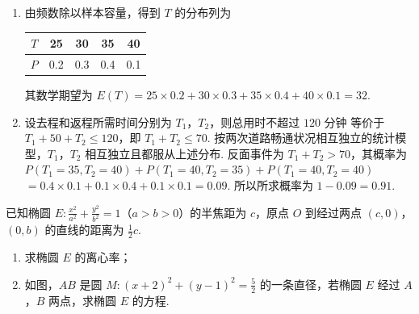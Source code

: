 \begin{solution}
\begin{enumerate}
\item 由频数除以样本容量，得到 \(T\) 的分布列为
\begin{center}
\begin{tabular}{c|cccc}
 \(T\) & 25 & 30 & 35 & 40 \\
\hline
 \(P\) & 0.2 & 0.3 & 0.4 & 0.1
\end{tabular}
\end{center}
其数学期望为
\(E(T)=25\times0.2+30\times0.3+35\times0.4+40\times0.1=32\).

\item 设去程和返程所需时间分别为 \(T_{1}\)，\(T_{2}\)，则总用时不超过 \(120\text{ 分钟}\) 等价于
\(T_{1}+50+T_{2}\leqslant120\)，即 \(T_{1}+T_{2}\leqslant70\). 按两次道路畅通状况相互独立的统计模型，\(T_{1}\)，\(T_{2}\) 相互独立且都服从上述分布. 反面事件为 \(T_{1}+T_{2}>70\)，其概率为
\(P(T_{1}=35,T_{2}=40)+P(T_{1}=40,T_{2}=35)+P(T_{1}=40,T_{2}=40)\)
\(=0.4\times0.1+0.1\times0.4+0.1\times0.1=0.09\).
所以所求概率为 \(1-0.09=0.91\).
\end{enumerate}
\end{solution}

\begin{problem}
已知椭圆 \(E: \frac{x^2}{a^2} + \frac{y^2}{b^2} = 1\)（\(a > b > 0\)）的半焦距为 \(c\)，原点 \(O\) 到经过两点 \((c,0)\)，\((0,b)\) 的直线的距离为 \(\frac{1}{2}c\).

\begin{enumerate}
\item 求椭圆 \(E\) 的离心率；
\item 如图，\(AB\) 是圆 \(M\colon (x+2)^{2} + (y-1)^{2} = \frac{5}{2}\) 的一条直径，若椭圆 \(E\) 经过 \(A\)，\(B\) 两点，求椭圆 \(E\) 的方程.
\end{enumerate}

\end{problem}

